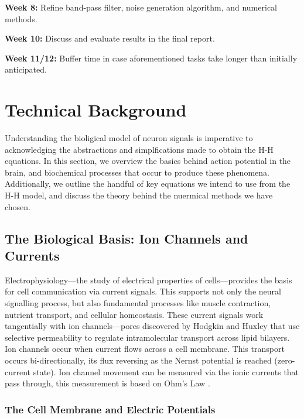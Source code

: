 \documentclass{article} %
\begin{document}
\begin{multicols}{2}
\textbf{Week 8: } Refine band-pass filter, noise generation algorithm, and numerical methods.

\textbf{Week 10: } Discuss and evaluate results in the final report.

\textbf{Week 11/12: } Buffer time in case aforementioned tasks take longer than initially anticipated.


\section{Technical Background}
\label{sec:technical_background}

Understanding the bioligical model of neuron signals is imperative to acknowledging the abstractions and simplfications made to obtain the H-H equations.
In this section, we overview the basics behind action potential in the brain, and biochemical processes that occur to produce these phenomena.
Additionally, we outline the handful of key equations we intend to use from the H-H model, and discuss the theory behind the nuermical methods we have chosen.

\subsection{The Biological Basis: Ion Channels and Currents}
\label{subsec:biological_basis}

Electrophysiology—the study of electrical properties of cells—provides the basis for cell communication via current signals. This supports not only the neural signalling process, but also fundamental processes like muscle contraction, nutrient transport, and cellular homeostasis. These current signals work tangentially with ion channels—pores discovered by Hodgkin and Huxley that use selective permeability to regulate intramolecular transport across lipid bilayers. Ion channels occur when current flows across a cell membrane. This transport occurs bi-directionally, its flux reversing as the Nernst potential is reached (zero-current state). Ion channel movement can be measured via the ionic currents that pass through, this measurement is based on Ohm's Law \cite{rubaiy2017electrophysiology}.

\subsubsection{The Cell Membrane and Electric Potentials}
\label{subsubsec:resting_potential}


\end{multicols}
\end{document}
